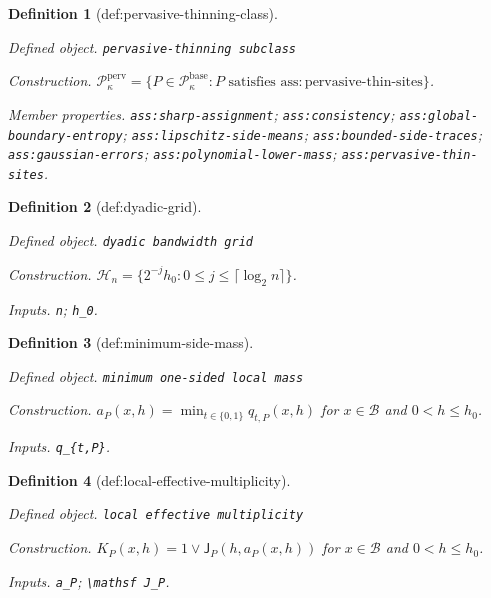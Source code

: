 \documentclass{article}
\newtheorem{definition}{Definition}
\begin{document}
\begin{definition}[def:pervasive-thinning-class]\label{def:pervasive-thinning-class}
\par\smallskip\noindent\emph{Defined object.} \texttt{pervasive-\allowbreak{}thinning subclass}
\par\smallskip\noindent\emph{Construction.} \(\mathcal P_{\kappa}^{\mathrm{perv}}=\{P\in\mathcal P_{\kappa}^{\mathrm{base}}:P\text{ satisfies }\mathrm{ass:pervasive\text{-}thin\text{-}sites}\}\).
\par\smallskip\noindent\emph{Member properties.} \texttt{ass:\allowbreak{}sharp-\allowbreak{}assignment}; \texttt{ass:\allowbreak{}consistency}; \texttt{ass:\allowbreak{}global-\allowbreak{}boundary-\allowbreak{}entropy}; \texttt{ass:\allowbreak{}lipschitz-\allowbreak{}side-\allowbreak{}means}; \texttt{ass:\allowbreak{}bounded-\allowbreak{}side-\allowbreak{}traces}; \texttt{ass:\allowbreak{}gaussian-\allowbreak{}errors}; \texttt{ass:\allowbreak{}polynomial-\allowbreak{}lower-\allowbreak{}mass}; \texttt{ass:\allowbreak{}pervasive-\allowbreak{}thin-\allowbreak{}sites}.
\end{definition}

\begin{definition}[def:dyadic-grid]\label{def:dyadic-grid}
\par\smallskip\noindent\emph{Defined object.} \texttt{dyadic bandwidth grid}
\par\smallskip\noindent\emph{Construction.} \(\mathcal H_n=\{2^{-j}h_0:0\le j\le\lceil\log_2 n\rceil\}\).
\par\smallskip\noindent\emph{Inputs.} \texttt{n}; \texttt{h\_\allowbreak{}0}.
\end{definition}

\begin{definition}[def:minimum-side-mass]\label{def:minimum-side-mass}
\par\smallskip\noindent\emph{Defined object.} \texttt{minimum one-\allowbreak{}sided local mass}
\par\smallskip\noindent\emph{Construction.} \(a_P(x,h)=\min_{t\in\{0,1\}}q_{t,P}(x,h)\) for \(x\in\mathcal B\) and \(0<h\le h_0\).
\par\smallskip\noindent\emph{Inputs.} \texttt{q\_\allowbreak{}\{t,\allowbreak{}P\}\allowbreak{}}.
\end{definition}

\begin{definition}[def:local-effective-multiplicity]\label{def:local-effective-multiplicity}
\par\smallskip\noindent\emph{Defined object.} \texttt{local effective multiplicity}
\par\smallskip\noindent\emph{Construction.} \(K_P(x,h)=1\vee\mathsf J_P(h,a_P(x,h))\) for \(x\in\mathcal B\) and \(0<h\le h_0\).
\par\smallskip\noindent\emph{Inputs.} \texttt{a\_\allowbreak{}P}; \texttt{\textbackslash{}\allowbreak{}mathsf J\_\allowbreak{}P}.
\end{definition}
\end{document}

